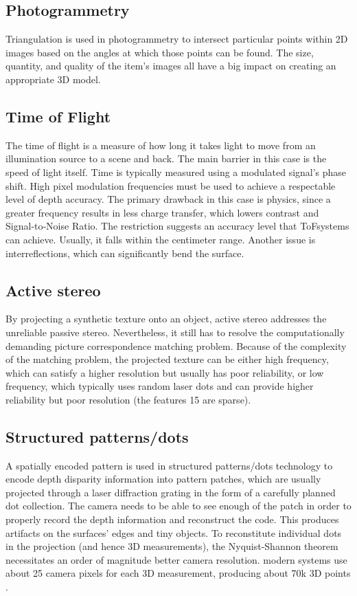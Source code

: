 \documentclass[12pt]{article}
\begin{document}
\subsection {Photogrammetry}
Triangulation is used in photogrammetry to intersect particular points within 2D images based on the angles at which those points can be found. The size, quantity, and quality of the item's images all have a big impact on creating an appropriate 3D model\cite{ref17}. 

\subsection{Time of Flight}
The time of flight is a measure of how long it takes light to move from an illumination source to a scene and back. The main barrier in this case is the speed of light itself.  Time is typically measured using a modulated signal's phase shift. High pixel modulation frequencies must be used to achieve a respectable level of depth accuracy. The primary drawback in this case is physics, since a greater frequency results in less charge transfer, which lowers contrast and Signal‑to‑Noise Ratio. The restriction suggests an accuracy level that ToFsystems can achieve. Usually, it falls within the centimeter range. Another issue is interreflections, which can significantly bend the surface\cite{ref15}.

\subsection{Active stereo}
By projecting a synthetic texture onto an object, active stereo addresses the unreliable passive stereo. Nevertheless, it still has to resolve the computationally demanding picture correspondence matching problem. Because of the complexity of the matching problem, the projected texture can be either high frequency, which can satisfy a higher resolution but usually has poor reliability, or low frequency, which typically uses random laser dots and can provide higher reliability but poor resolution (the features 15 are sparse)\cite{ref15}.

\subsection{Structured patterns/dots}
A spatially encoded pattern is used in structured patterns/dots technology to encode depth disparity information into pattern patches, which are usually projected through a laser diffraction grating in the form of a carefully planned dot collection. The camera needs to be able to see enough of the patch in order to properly record the depth information and reconstruct the code. This produces artifacts on the surfaces' edges and tiny objects. To reconstitute individual dots in the projection (and hence 3D measurements), the Nyquist-Shannon theorem necessitates an order of magnitude better camera resolution. modern systems use about 25 camera pixels for each 3D measurement, producing about 70k 3D points \cite{ref15}. 
\end{document}
